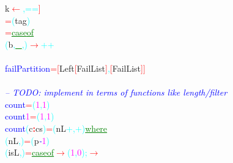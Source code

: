 {{{\rm{}k}\hsspace \textcolor{red}{\ensuremath{\leftarrow}}\textcolor{cyan}{,}\hsspace \textcolor{cyan}{==}\textcolor{red}{]}\\\hsspace \hsspace \textcolor{red}{=}\hsspace \textcolor{cyan}{(}{\rm{}tag}\textcolor{cyan}{)}\\\hsspace \textcolor{red}{=}\hsspace \textcolor{green}{\underline{case}}\hsspace \textcolor{green}{\underline{of}}\\\hstab {}\hsspace \textcolor{cyan}{(}{\rm{}b}\textcolor{cyan}{,}\hsspace \textcolor{green}{\underline{\_}}\textcolor{cyan}{,}\textcolor{cyan}{)}\hsspace \textcolor{red}{\ensuremath{\rightarrow}}\hsspace \textcolor{cyan}{++}\\\\\textcolor{blue}{failPartition}\hsspace \textcolor{red}{=}\hsspace \textcolor{red}{[}{\rm{}Left}\hsspace \textcolor{red}{[}{\rm{}FailList}\textcolor{red}{]}\textcolor{cyan}{,}\hsspace \textcolor{red}{[}{\rm{}FailList}\textcolor{red}{]}\textcolor{red}{]}\\\\\textcolor{blue}{{\it{}-- TODO: implement in terms of functions like length/filter}}\\\textcolor{blue}{count}\hsspace {\rm{}[]}\hsspace \hsspace \hsspace \hsspace \hsspace \textcolor{red}{=}\hsspace \textcolor{cyan}{(}\textcolor{magenta}{1}\textcolor{cyan}{,}\textcolor{magenta}{1}\textcolor{cyan}{)}\\\textcolor{blue}{count}\hsspace \textcolor{magenta}{1}\hsspace \hsspace \hsspace \hsspace \hsspace \textcolor{red}{=}\hsspace \textcolor{cyan}{(}\textcolor{magenta}{1}\textcolor{cyan}{,}\textcolor{magenta}{1}\textcolor{cyan}{)}\\\textcolor{blue}{count}\hsspace \textcolor{cyan}{(}{\rm{}c}\textcolor{red}{{\bf{}:}}{\rm{}cs}\textcolor{cyan}{)}\hsspace \textcolor{red}{=}\hsspace \textcolor{cyan}{(}{\rm{}nL}\hsspace \textcolor{cyan}{+}\textcolor{cyan}{,}\hsspace \textcolor{cyan}{+}\textcolor{cyan}{)}\hsspace \textcolor{green}{\underline{where}}\\\hstab \textcolor{cyan}{(}{\rm{}nL}\textcolor{cyan}{,}\textcolor{cyan}{)}\hsspace \textcolor{red}{=}\hsspace \textcolor{cyan}{(}{\rm{}p}\textcolor{blue}{{\it{}-}}\textcolor{magenta}{1}\textcolor{cyan}{)}\\\hstab \textcolor{cyan}{(}{\rm{}isL}\textcolor{cyan}{,}\textcolor{cyan}{)}\hsspace \textcolor{red}{=}\hsspace \textcolor{green}{\underline{case}}\hsspace \textcolor{green}{\underline{of}}\hsspace \textcolor{red}{\ensuremath{\rightarrow}}\hsspace \textcolor{cyan}{(}\textcolor{magenta}{1}\textcolor{cyan}{,}\textcolor{magenta}{0}\textcolor{cyan}{)}\textcolor{cyan}{;}\hsspace \textcolor{red}{\ensuremath{\rightarrow}}\hsspace }}
